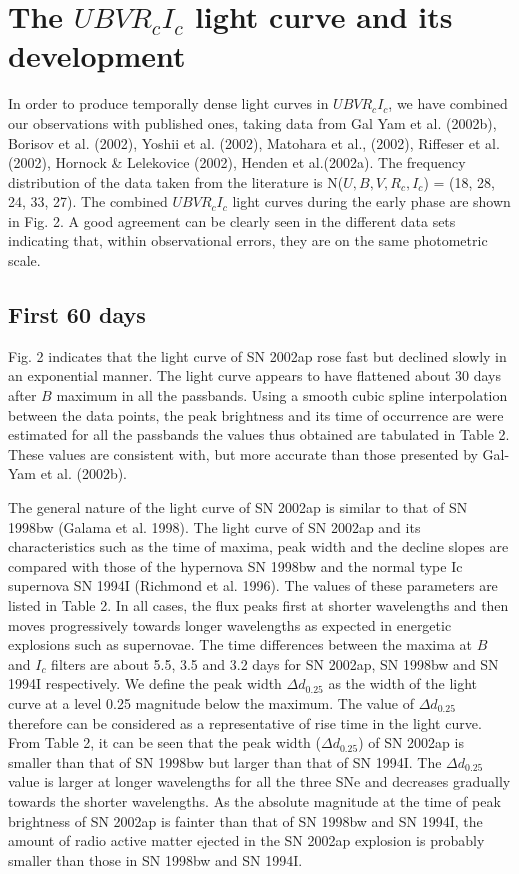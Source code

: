 \section{The $UBVR_cI_c$ light curve and its development}

In order to produce temporally dense light curves in $UBVR_cI_c$, we have
combined our observations with published ones, taking data from
Gal Yam et al. (2002b), Borisov et al.  (2002), Yoshii et
al. (2002), Matohara et al., (2002), Riffeser et al. (2002), Hornock \& Lelekovice (2002), 
 Henden et al.(2002a). The frequency distribution of 
the data taken from the literature is N($U, B, V, R_c, I_c$) = (18, 28, 24, 33, 27). 
The combined $UBVR_cI_c$ light curves during the early phase are shown in Fig. 2. A good agreement
can be clearly seen in the different data sets indicating that, within
observational errors, they are on the same photometric scale. 

\subsection{First 60 days}

Fig. 2 indicates that the light curve of SN 2002ap rose fast but declined slowly in an exponential
manner. The light curve appears to have flattened
about 30 days after $B$ maximum in all the passbands. Using a smooth cubic
spline interpolation between the data points, the peak brightness and its time
of occurrence are were estimated for all the passbands the values thus obtained are tabulated
in Table 2. These values are consistent with, but
more accurate than those presented by Gal-Yam et al. (2002b).  

The general nature of the light curve of SN 2002ap is similar to that of SN
1998bw (Galama et al. 1998). The light curve of SN 2002ap and its characteristics
such as the time of maxima, peak width and the decline slopes are compared with those 
of the hypernova SN 1998bw and the normal type Ic supernova SN 1994I 
(Richmond et al. 1996). The values of these parameters are listed in Table 2. 
In all cases, the flux peaks first at
shorter wavelengths and then moves progressively towards longer wavelengths
as expected in energetic explosions such as supernovae. The time differences
between the maxima at $B$ and $I_c$ filters are about 5.5, 3.5 and 3.2 days
for SN 2002ap, SN 1998bw and SN 1994I respectively. 
We define the peak width $\Delta d_{0.25}$ as the width of the light curve at a
level 0.25 magnitude below the maximum. The value of $\Delta d_{0.25}$ therefore can be 
considered
as a representative of rise time in the light curve. From Table 2, it can be seen that the peak
width ($\Delta d_{0.25}$) of SN 2002ap is smaller than that of SN 1998bw but larger than that
of SN 1994I. The $\Delta d_{0.25}$ value is larger at longer wavelengths
for all the three SNe and decreases gradually towards the shorter
wavelengths. As the absolute magnitude at the time of peak brightness of
SN 2002ap is fainter than that of SN 1998bw and SN 1994I, the amount of
radio active matter ejected in the SN 2002ap explosion is probably smaller 
than those in SN 1998bw and SN 1994I. 


